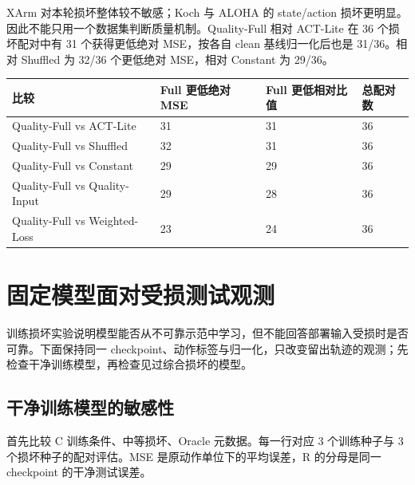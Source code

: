 \documentclass[11pt,a4paper,fontset=fandol]{ctexart}
\begin{document}
XArm 对本轮损坏整体较不敏感；Koch 与 ALOHA 的 state/action 损坏更明显。因此不能只用一个数据集判断质量机制。Quality-Full 相对 ACT-Lite 在 36 个损坏配对中有 31 个获得更低绝对 MSE，按各自 clean 基线归一化后也是 31/36。相对 Shuffled 为 32/36 个更低绝对 MSE，相对 Constant 为 29/36。

\begin{table}[htbp]
\centering
\small
\begin{tabularx}{\linewidth}{Y C{29mm} C{29mm} C{24mm}}
\toprule
比较 & Full 更低绝对 MSE & Full 更低相对比值 & 总配对数\\
\midrule
Quality-Full vs ACT-Lite & 31 & 31 & 36\\
Quality-Full vs Shuffled & 32 & 31 & 36\\
Quality-Full vs Constant & 29 & 29 & 36\\
Quality-Full vs Quality-Input & 29 & 28 & 36\\
Quality-Full vs Weighted-Loss & 23 & 24 & 36\\
\bottomrule
\end{tabularx}
\end{table}
\clearpage\section{固定模型面对受损测试观测}
训练损坏实验说明模型能否从不可靠示范中学习，但不能回答部署输入受损时是否可靠。下面保持同一 checkpoint、动作标签与归一化，只改变留出轨迹的观测；先检查干净训练模型，再检查见过综合损坏的模型。

\subsection{干净训练模型的敏感性}
首先比较 C 训练条件、中等损坏、Oracle 元数据。每一行对应 3 个训练种子与 3 个损坏种子的配对评估。MSE 是原动作单位下的平均误差，R 的分母是同一 checkpoint 的干净测试误差。
\end{document}
